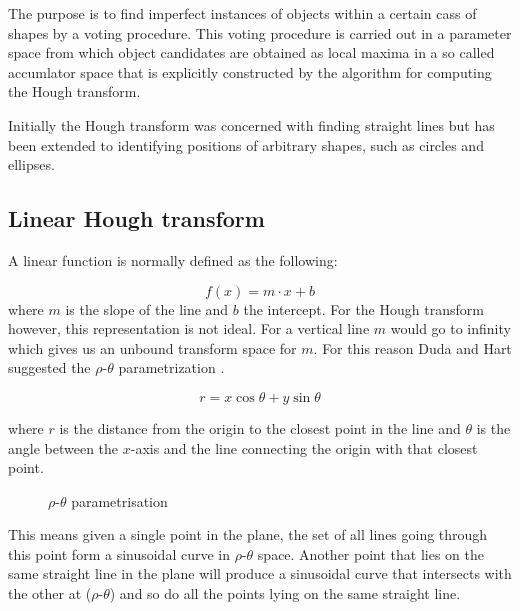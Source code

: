 \documentclass[11pt,twoside]{scrreprt}
\begin{document}
The purpose is to find imperfect instances of objects within a certain cass of shapes by a voting procedure. This voting procedure is carried out in a parameter space from which object candidates are obtained as local maxima in a so called accumlator space that is explicitly constructed by the algorithm for computing the Hough transform.

Initially the Hough transform was concerned with finding straight lines but has been extended to identifying positions of arbitrary shapes, such as circles and ellipses.

\subsection{Linear Hough transform} %
\label{sub:linear_hough_transform}

A linear function is normally defined as the following:

\[
  f(x) = m\cdot x + b
\]
where $m$ is the slope of the line and $b$ the intercept. For the Hough transform however, this representation is not ideal. For a vertical line $m$ would go to infinity which gives us an unbound transform space for $m$. For this reason Duda and Hart suggested the $\rho\text{-}\theta$ parametrization \parencite{Duda:1972}.

\begin{equation}
  r = x\cos\theta + y\sin\theta\label{eq:param_eq}
\end{equation}

where $r$ is the distance from the origin to the closest point in the line and $\theta$ is the angle between the $x$-axis and the line connecting the origin with that closest point.

\begin{figure}[ht]
  \centering
  \caption{$\rho\text{-}\theta$ parametrisation}
  \label{fig:rhotheta}
\end{figure}

This means given a single point in the plane, the set of all lines going through this point form a sinusoidal curve in $\rho\text{-}\theta$ space. Another point 
that lies on the same straight line in the plane will produce a sinusoidal curve that intersects with the other at ($\rho\text{-}\theta$) and so do all the points lying on the same straight line. 
\end{document}
